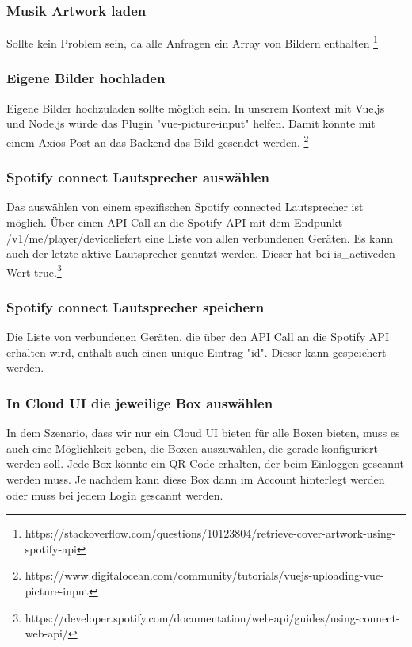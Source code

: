 \documentclass[10pt, a4paper, draft]{article}
\begin{document}
\subsubsection{Musik Artwork laden}
Sollte kein Problem sein, da alle Anfragen ein Array von Bildern enthalten \footnote{https://stackoverflow.com/questions/10123804/retrieve-cover-artwork-using-spotify-api}

\subsubsection{Eigene Bilder hochladen}
Eigene Bilder hochzuladen sollte möglich sein. In unserem Kontext mit Vue.js und Node.js würde das Plugin "vue-picture-input" helfen.
Damit könnte mit einem Axios Post an das Backend das Bild gesendet werden. \footnote{https://www.digitalocean.com/community/tutorials/vuejs-uploading-vue-picture-input}

\subsubsection{Spotify connect Lautsprecher auswählen}
Das auswählen von einem spezifischen Spotify connected Lautsprecher ist möglich.
Über einen API Call an die Spotify API mit dem Endpunkt \glqq /v1/me/player/device\grqq liefert eine Liste von allen verbundenen Geräten.
Es kann auch der letzte aktive Lautsprecher genutzt werden. Dieser hat bei \glqq is_active\grqq den Wert \glqq true\grqq.\footnote{https://developer.spotify.com/documentation/web-api/guides/using-connect-web-api/}

\subsubsection{Spotify connect Lautsprecher speichern}
Die Liste von verbundenen Geräten, die über den API Call an die Spotify API erhalten wird, enthält auch einen unique Eintrag "id". Dieser kann gespeichert werden.

\subsubsection{In Cloud UI die jeweilige Box auswählen}
In dem Szenario, dass wir nur ein Cloud UI bieten für alle Boxen bieten, muss es auch eine Möglichkeit geben, die Boxen auszuwählen, die gerade konfiguriert werden soll.
Jede Box könnte ein QR-Code erhalten, der beim Einloggen gescannt werden muss. Je nachdem kann diese Box dann im Account hinterlegt werden oder muss bei jedem Login gescannt werden.
\end{document}
